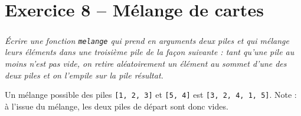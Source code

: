 \section*{Exercice 8 -- Mélange de cartes}
\setcounter{exo}{0}
\subparagraph*{}
\textit{Écrire une fonction \texttt{melange} qui prend en arguments deux piles et qui
mélange leurs éléments dans une troisième pile de la façon suivante : tant qu’une pile au moins n’est pas vide, on retire aléatoirement un élément au sommet d’une des deux piles et on l’empile sur la pile résultat. }
\begin{exemple}
Un mélange possible des piles \texttt{[1, 2, 3]} et \texttt{[5, 4]} est \texttt{[3, 2, 4, 1, 5]}. Note : à l’issue du mélange, les deux piles de départ sont donc vides.
\end{exemple}

\ifprof
\begin{corrige}
\end{corrige}
\else
\fi
%


